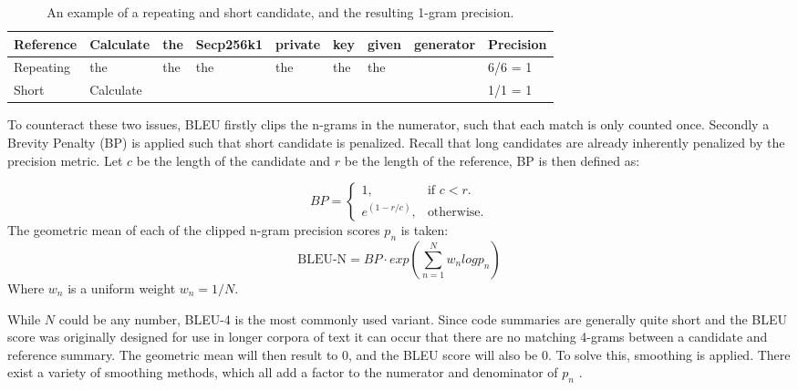 \label{tab:BLEUIssues}
\begin{table}[H]
\begin{tabular}{l|lllllll|l}
\rowcolor[HTML]{C0C0C0} 
Reference & Calculate & the & Secp256k1 & private & key & given & generator & Precision \\ \hline
Repeating & the       & the & the       & the     & the & the   &           & 6/6 = 1   \\
Short     & Calculate &     &           &         &     &       &           & 1/1 = 1  
\end{tabular}
\caption{An example of a repeating and short candidate, and the resulting 1-gram precision.}
\end{table}

To counteract these two issues, BLEU firstly clips the n-grams in the numerator, such that each match is only counted once. Secondly a Brevity Penalty (BP) is applied such that short candidate is penalized. Recall that long candidates are already inherently penalized by the precision metric. Let \(c\) be the length of the candidate and \(r\) be the length of the reference, BP is then defined as:

\begin{equation}
  BP=\begin{cases}
    1, & \text{if $c<r$}.\\
    e^{(1 - r/c)}, & \text{otherwise}.
  \end{cases}
\end{equation}
The geometric mean of each of the clipped n-gram precision scores \(p_n\) is taken:
\[ \text{BLEU-N} = BP \cdot exp(\sum_{n=1}^{N} w_n log p_n ) \]
Where \(w_n\) is a uniform weight \(w_n = 1/N\).

While \(N\) could be any number, BLEU-4 is the most commonly used variant. Since code summaries are generally quite short and the BLEU score was originally designed for use in longer corpora of text it can occur that there are no matching 4-grams between a candidate and reference summary\cite{evaluationSummarization}. The geometric mean will then result to 0, and the BLEU score will also be 0. To solve this, smoothing is applied. There exist a variety of smoothing methods, which all add a factor to the numerator and denominator of \(p_n\) \cite{evaluationSummarization}.

